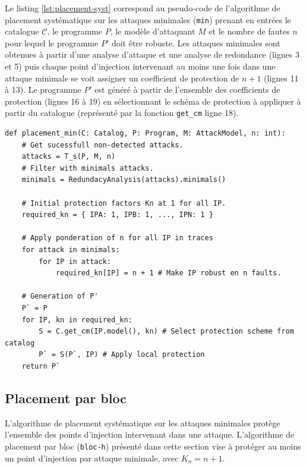             Le listing \ref{lst:placement-syst} correspond au pseudo-code de l'algorithme de placement systématique sur les attaques minimales (\texttt{min}) prenant en entrées le catalogue $\mathcal{C}$, le programme $P$, le modèle d'attaquant $M$ et le nombre de fautes $n$ pour lequel le programme $P'$ doit être robuste.
            Les attaques minimales sont obtenues à partir d'une analyse d'attaque et une analyse de redondance (lignes 3 et 5) puis chaque point d'injection intervenant au moins une fois dans une attaque minimale se voit assigner un coefficient de protection de $n + 1$ (lignes 11 à 13).
            Le programme $P'$ est généré à partir de l'ensemble des coefficients de protection (lignes 16 à 19) en sélectionnant le schéma de protection à appliquer à partir du catalogue (représenté par la fonction \texttt{get\_cm} ligne 18).

\begin{lstlisting}
def placement_min(C: Catalog, P: Program, M: AttackModel, n: int):
    # Get sucessfull non-detected attacks.
    attacks = T_s(P, M, n)
    # Filter with minimals attacks.
    minimals = RedundacyAnalysis(attacks).minimals()
    
    # Initial protection factors Kn at 1 for all IP.
    required_kn = { IPA: 1, IPB: 1, ..., IPN: 1 }

    # Apply ponderation of n for all IP in traces
    for attack in minimals:
        for IP in attack:
            required_kn[IP] = n + 1 # Make IP robust en n faults.

    # Generation of P'
    P` = P
    for IP, kn in required_kn:
        S = C.get_cm(IP.model(), kn) # Select protection scheme from catalog
        P` = S(P`, IP) # Apply local protection        
    return P`
\end{lstlisting}  

        \subsection{Placement par bloc}
        \label{sec:placement-bloc}

            L'algorithme de placement systématique sur les attaques minimales protège l'ensemble des points d'injection intervenant dans une attaque.
            L'algorithme de placement par bloc (\texttt{bloc-h}) présenté dans cette section vise à protéger au moins un point d'injection par attaque minimale, avec $K_n = n + 1$.

